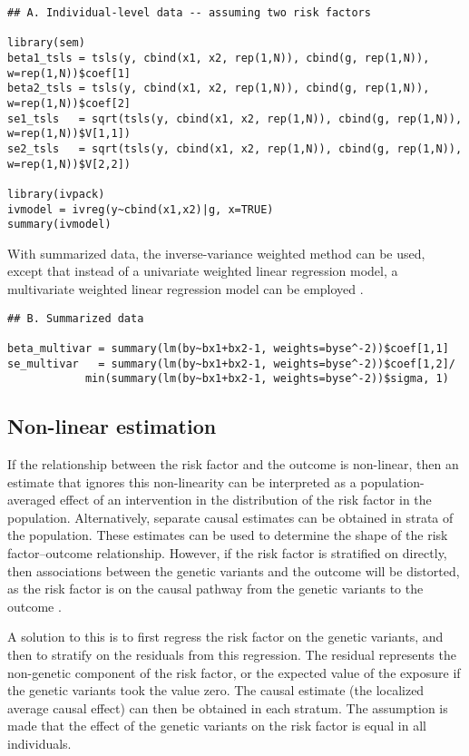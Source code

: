 \documentclass[a4paper,12pt]{article} %
\begin{document}
\begin{lstlisting}
## A. Individual-level data -- assuming two risk factors

library(sem)
beta1_tsls = tsls(y, cbind(x1, x2, rep(1,N)), cbind(g, rep(1,N)), w=rep(1,N))$coef[1]
beta2_tsls = tsls(y, cbind(x1, x2, rep(1,N)), cbind(g, rep(1,N)), w=rep(1,N))$coef[2]
se1_tsls   = sqrt(tsls(y, cbind(x1, x2, rep(1,N)), cbind(g, rep(1,N)), w=rep(1,N))$V[1,1])
se2_tsls   = sqrt(tsls(y, cbind(x1, x2, rep(1,N)), cbind(g, rep(1,N)), w=rep(1,N))$V[2,2])

library(ivpack)
ivmodel = ivreg(y~cbind(x1,x2)|g, x=TRUE)
summary(ivmodel)
\end{lstlisting}

With summarized data, the inverse-variance weighted method can be used, except that instead of a univariate weighted linear regression model, a multivariate weighted linear regression model can be employed \citep{burgess2014pleioajeappendix}.

\begin{lstlisting}
## B. Summarized data

beta_multivar = summary(lm(by~bx1+bx2-1, weights=byse^-2))$coef[1,1]
se_multivar   = summary(lm(by~bx1+bx2-1, weights=byse^-2))$coef[1,2]/
            min(summary(lm(by~bx1+bx2-1, weights=byse^-2))$sigma, 1)
\end{lstlisting}

\clearpage

\subsection{Non-linear estimation}
If the relationship between the risk factor and the outcome is non-linear, then an estimate that ignores this non-linearity can be interpreted as a population-averaged effect of an intervention in the distribution of the risk factor in the population. Alternatively, separate causal estimates can be obtained in strata of the population. These estimates can be used to determine the shape of the risk factor--outcome relationship. However, if the risk factor is stratified on directly, then associations between the genetic variants and the outcome will be distorted, as the risk factor is on the causal pathway from the genetic variants to the outcome \citep{burgess2014nonlin}.

A solution to this is to first regress the risk factor on the genetic variants, and then to stratify on the residuals from this regression. The residual represents the non-genetic component of the risk factor, or the expected value of the exposure if the genetic variants took the value zero. The causal estimate (the localized average causal effect) can then be obtained in each stratum. The assumption is made that the effect of the genetic variants on the risk factor is equal in all individuals.
\end{document}
